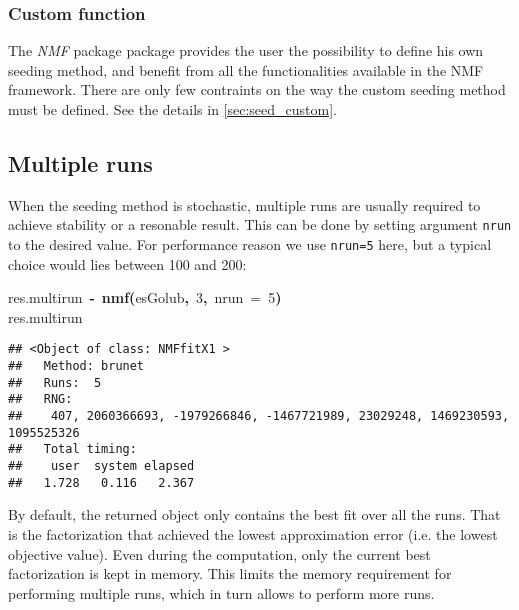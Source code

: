\documentclass[a4paper]{article}\usepackage{graphicx, color}
\makeatletter
\newcommand{\hlnumber}[1]{\textcolor[rgb]{0,0,0}{#1}}%
\newcommand{\hlfunctioncall}[1]{\textcolor[rgb]{0.501960784313725,0,0.329411764705882}{\textbf{#1}}}%
\newcommand{\hlkeyword}[1]{\textcolor[rgb]{0,0,0}{\textbf{#1}}}%
\newcommand{\hlargument}[1]{\textcolor[rgb]{0.690196078431373,0.250980392156863,0.0196078431372549}{#1}}%
\newcommand{\hlassignement}[1]{\textcolor[rgb]{0,0,0}{\textbf{#1}}}%
\newcommand{\hlsymbol}[1]{\textcolor[rgb]{0,0,0}{#1}}%
\newcommand{\hlstd}[1]{\textcolor[rgb]{0,0,0}{#1}}%
\newenvironment{kframe}{%
 \def\FrameCommand##1{\hskip\@totalleftmargin \hskip-\fboxsep
 \colorbox{shadecolor}{##1}\hskip-\fboxsep
     \hskip-\linewidth \hskip-\@totalleftmargin \hskip\columnwidth}%
 \MakeFramed {\advance\hsize-\width
   \@totalleftmargin\z@ \linewidth\hsize
   \@setminipage}}%
 {\par\unskip\endMakeFramed}
\newenvironment{knitrout}{}{} %
\let\code=\texttt
\newcommand{\pkgname}[1]{\textit{#1}\xspace}
\newcommand{\Rpkg}[1]{\pkgname{#1} package\xspace}
\newcommand{\nmfpack}{\Rpkg{NMF}}
\makeatother
\begin{document}
\subsubsection{Custom function}
The \nmfpack package provides the user the possibility to define his own seeding method, and benefit from all the functionalities available in the NMF framework.
There are only few contraints on the way the custom seeding method must be defined.
See the details in \cref{sec:seed_custom}.

\subsection{Multiple runs}

When the seeding method is stochastic, multiple runs are usually required to achieve stability or a resonable result.
This can be done by setting argument \code{nrun} to the desired value. 
For performance reason we use \code{nrun=5} here, but a typical choice would lies between 100 and 200:  

\begin{knitrout}
\color{fgcolor}\begin{kframe}
\begin{flushleft}
\ttfamily\noindent
\hlsymbol{res.multirun}{\ }\hlassignement{\usebox{\hlnormalsizeboxlessthan}-}{\ }\hlfunctioncall{nmf}\hlkeyword{(}\hlsymbol{esGolub}\hlkeyword{,}{\ }\hlnumber{3}\hlkeyword{,}{\ }\hlargument{nrun}{\ }\hlargument{=}{\ }\hlnumber{5}\hlkeyword{)}\hspace*{\fill}\\
\hlstd{}\hlsymbol{res.multirun}\mbox{}
\normalfont
\end{flushleft}
\begin{verbatim}
## <Object of class: NMFfitX1 >
##   Method: brunet 
##   Runs:  5 
##   RNG:
##    407, 2060366693, -1979266846, -1467721989, 23029248, 1469230593, 1095525326 
##   Total timing:
##    user  system elapsed 
##   1.728   0.116   2.367 
\end{verbatim}
\end{kframe}
\end{knitrout}


By default, the returned object only contains the best fit over all the runs.
That is the factorization that achieved the lowest approximation error (i.e. the lowest objective value).
Even during the computation, only the current best factorization is kept in memory.
This limits the memory requirement for performing multiple runs, which in turn allows to perform more runs.
\end{document}
